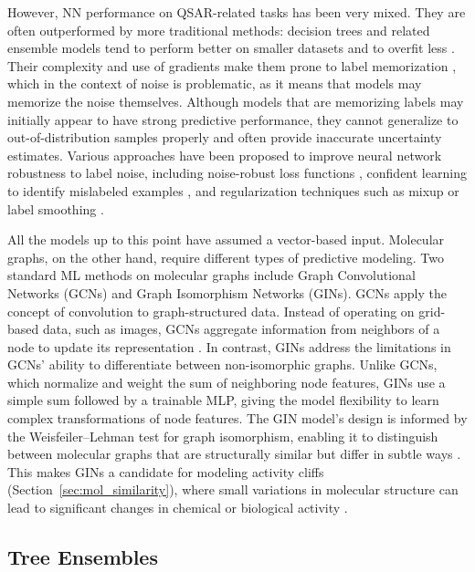 However, NN performance on QSAR-related tasks has been very mixed. They are often outperformed by more traditional methods: decision trees and related ensemble models tend to perform better on smaller datasets and to overfit less \citep{Baskin2008, Koutsoukas2017}. Their complexity and use of gradients make them prone to label memorization \citep{Zhang2017}, which in the context of noise is problematic, as it means that models may memorize the noise themselves. Although models that are memorizing labels may initially appear to have strong predictive performance, they cannot generalize to out-of-distribution samples properly and often provide inaccurate uncertainty estimates. Various approaches have been proposed to improve neural network robustness to label noise, including noise-robust loss functions \citep{Song2022}, confident learning to identify mislabeled examples \citep{Northcutt2021}, and regularization techniques such as mixup \citep{Zhang2018mixup} or label smoothing \citep{Szegedy2015}. 

All the models up to this point have assumed a vector-based input. Molecular graphs, on the other hand, require different types of predictive modeling. Two standard ML methods on molecular graphs include Graph Convolutional Networks (GCNs) and Graph Isomorphism Networks (GINs). GCNs apply the concept of convolution to graph-structured data. Instead of operating on grid-based data, such as images, GCNs aggregate information from neighbors of a node to update its representation \citep{TeachOpenCADD2023, Xu2019}. In contrast, GINs address the limitations in GCNs’ ability to differentiate between non-isomorphic graphs. Unlike GCNs, which normalize and weight the sum of neighboring node features, GINs use a simple sum followed by a trainable MLP, giving the model flexibility to learn complex transformations of node features. The GIN model’s design is informed by the Weisfeiler--Lehman test for graph isomorphism, enabling it to distinguish between molecular graphs that are structurally similar but differ in subtle ways \citep{TeachOpenCADD2023, Xu2019}. This makes GINs a candidate for modeling activity cliffs (Section~\ref{sec:mol_similarity}), where small variations in molecular structure can lead to significant changes in chemical or biological activity \citep{TeachOpenCADD2023}. 


\subsection{Tree Ensembles}


